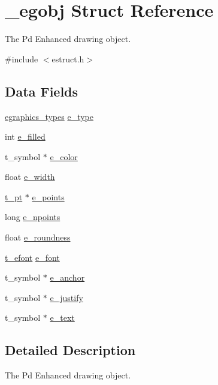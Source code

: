 \hypertarget{struct__egobj}{\section{\-\_\-egobj Struct Reference}
\label{struct__egobj}
}


The Pd Enhanced drawing object.  




{\ttfamily \#include $<$estruct.\-h$>$}

\subsection*{Data Fields}
\begin{DoxyCompactItemize}
\item 
\hyperlink{estruct_8h_acc57a0407e8e1eaa69028654742baf3f}{egraphics\-\_\-types} \hyperlink{struct__egobj_a8083c24bd4930af629d483d7bf45a20a}{e\-\_\-type}
\item 
int \hyperlink{struct__egobj_ae13e50cb319a060b3e612c39d0fc698d}{e\-\_\-filled}
\item 
t\-\_\-symbol $\ast$ \hyperlink{struct__egobj_a13dfb00aea95e0dc5b9d1297260a9280}{e\-\_\-color}
\item 
float \hyperlink{struct__egobj_abe0dac7e3167ea1dd6c4e238ab4ab8bd}{e\-\_\-width}
\item 
\hyperlink{struct__pt}{t\-\_\-pt} $\ast$ \hyperlink{struct__egobj_a579eafd42827c9bdcddc613774309ad3}{e\-\_\-points}
\item 
long \hyperlink{struct__egobj_a216eff6ab0216b35e215bd1c1b8fb0d0}{e\-\_\-npoints}
\item 
float \hyperlink{struct__egobj_ab2c5a6f93a125c4862295e28aad05a74}{e\-\_\-roundness}
\item 
\hyperlink{struct__efont}{t\-\_\-efont} \hyperlink{struct__egobj_a4bf02b4e1a6c0c7723b5ed198f45e0b0}{e\-\_\-font}
\item 
t\-\_\-symbol $\ast$ \hyperlink{struct__egobj_a26003aea4ac1d50f79a5db2e05599222}{e\-\_\-anchor}
\item 
t\-\_\-symbol $\ast$ \hyperlink{struct__egobj_a41dc1b542ee19a3171a52480dff2c664}{e\-\_\-justify}
\item 
t\-\_\-symbol $\ast$ \hyperlink{struct__egobj_a5f97b246c0da885ff0cd44b32a967338}{e\-\_\-text}
\end{DoxyCompactItemize}


\subsection{Detailed Description}
The Pd Enhanced drawing object. 

